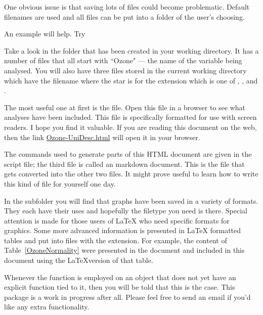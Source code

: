 One obvious issue is that saving lots of files could become problematic. Default filenames are used and all files can be put into a folder of the user's choosing. 
 
An example will help. Try 

\begin{Schunk}
\end{Schunk}

Take a look in the  folder that has been created in your working directory. It has a number of files that all start with ``Ozone" --- the name of the variable being analysed.  You will also have three files stored in the current working directory which have the filename  where the star is for the extension which is one of , , and . 
 
The most useful one at first is the  file. Open this file in a browser to see what analyses have been included. This file is specifically formatted for use with screen readers. I hope you find it valuable. If you are reading this document on the web, then the link \url{Ozone-UniDesc.html} will open it in your browser.  
 
The commands used to generate parts of this HTML document are given in the \R{} script file; the third file is called an \R{} markdown document. This is the file that gets converted into the other two files. It might prove useful to learn how to write this kind of file for yourself one day. 
 
In the  subfolder you will find that graphs have been saved in a variety of formats. They each have their uses and hopefully the filetype you need is there. Special attention is made for those users of \LaTeX{} who need specific formats for graphics. Some more advanced information is presented in \LaTeX{} formatted tables and put into files with the  extension. For example, the content of Table~\ref{OzoneNormality} were presented in the  document and included in this document using the \LaTeX{}version of that table. 
 
 
 
Whenever the  function is employed on an object that does not yet have an explicit function tied to it, then you will be told that this is the case. This package is a work in progress after all. Please feel free to send an email if you'd like any extra functionality. 
 
